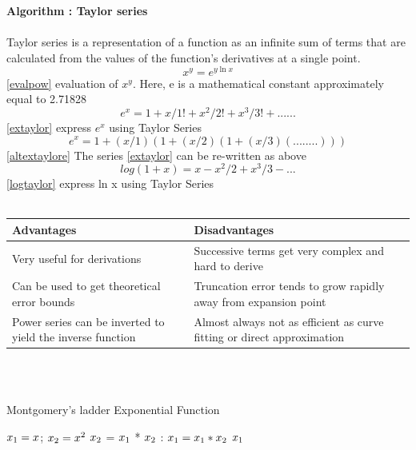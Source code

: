 \documentclass[letterpaper, 11pt]{report}
\begin{document}
\textbf{\\ \\ Algorithm : Taylor series}\\ \\Taylor series is a representation of a function as an infinite sum of terms that are calculated from the values of the function's derivatives at a single point.
\begin{equation} \label{evalpow}
x^y= e^{y\ln x}
\end{equation}
\ref{evalpow} evaluation of $x^y$. Here, e is a mathematical constant approximately equal to  2.71828
\begin{equation} \label{extaylor}
e^x = 1 + x/1! + x^2/2! + x^3/3! + ...... 
\end{equation}
\ref{extaylor} express $e^x$ using Taylor Series
\begin{equation} \label{altextaylore}
e^x = 1 + (x/1) (1 + (x/2) (1 + (x/3) (........) ) ) 
\end{equation}
\ref{altextaylore} The series \ref{extaylor} can be re-written as above
\begin{equation} \label{logtaylor}
log(1+x) = x-x^2/2 + x^3/3- ... 
\end{equation}
\ref{logtaylor} express ln x using Taylor Series\\ \\

\setlength{\tabcolsep}{18pt}
\renewcommand{\arraystretch}{1.5}
\begin{tabular}{ |p{6cm}|p{6cm}| }
\hline
\textbf{Advantages} & \textbf{Disadvantages}\\ \hline 
Very useful for derivations
 & Successive terms get very complex and hard to derive\\
\hline
Can be used to get theoretical error bounds &Truncation error tends to grow rapidly away from expansion point\\
\hline
Power series can be inverted to yield the inverse function & Almost always not as efficient as curve fitting or direct approximation\\
\hline
\end{tabular} \\ \\ 
\begin{algorithm}
\caption{Montgomery's ladder Exponential Function}\label{exp3}
\begin{algorithmic}[1]
\Require $x\textsubscript{1} = x$; $x\textsubscript{2} = x^2$
\State  $x\textsubscript{2}$ = $x\textsubscript{1}$ * $x\textsubscript{2}$ 
 \Else:
\State $x\textsubscript{1} = x\textsubscript{1} * x\textsubscript{2}$   
\State \Return $x\textsubscript{1}$
 \EndIf
 \EndFor
\end{algorithmic}
\end{algorithm}
\end{document}
